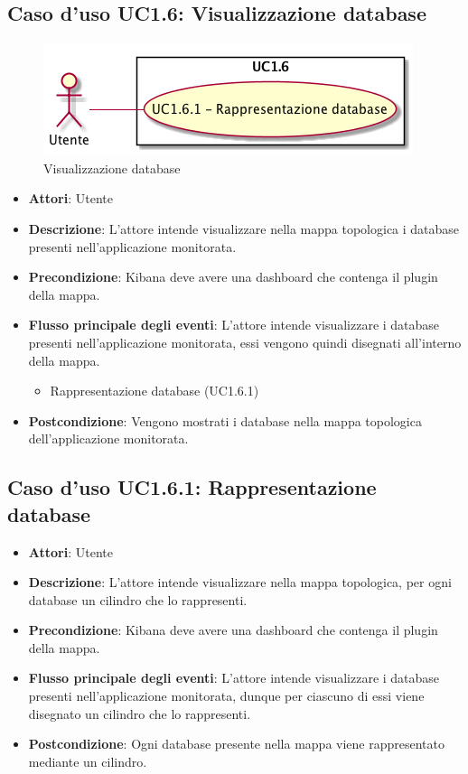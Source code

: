 \subsection{Caso d'uso UC1.6: Visualizzazione database}
\begin{figure} [H]
	\centering
	\includegraphics[scale=0.45]{./UC/UC1-6.png}
	\caption{Visualizzazione database}\label{}
\end{figure}
\begin{itemize}
	\item \textbf{Attori}: Utente
	\item \textbf{Descrizione}: L'attore intende visualizzare nella mappa topologica i database presenti nell'applicazione monitorata.
	\item \textbf{Precondizione}: Kibana deve avere una dashboard che contenga il plugin della mappa.
	\item \textbf{Flusso principale degli eventi}: L'attore intende visualizzare i database presenti nell'applicazione monitorata, essi vengono quindi disegnati all'interno della mappa.
	\begin{itemize}
		\item Rappresentazione database (UC1.6.1)
	\end{itemize}
	\item \textbf{Postcondizione}: Vengono mostrati i database nella mappa topologica dell'applicazione monitorata.
\end{itemize}
\subsection{Caso d'uso UC1.6.1: Rappresentazione database}
\begin{itemize}
	\item \textbf{Attori}: Utente
	\item \textbf{Descrizione}: L'attore intende visualizzare nella mappa topologica, per ogni database un cilindro che lo rappresenti.
	\item \textbf{Precondizione}: Kibana deve avere una dashboard che contenga il plugin della mappa.
	\item \textbf{Flusso principale degli eventi}: L'attore intende visualizzare i database presenti nell'applicazione monitorata, dunque per ciascuno di essi viene disegnato un cilindro che lo rappresenti.
	
	\item \textbf{Postcondizione}: Ogni database presente nella mappa viene rappresentato mediante un cilindro.
\end{itemize}

